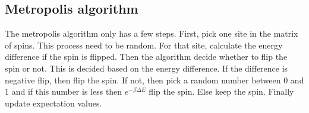 
\subsection{Metropolis algorithm}

The metropolis algorithm only has a few steps. First, pick one site in the matrix of spins. This process need to be random. For that site, calculate the energy difference if the spin is flipped. Then the algorithm decide whether to flip the spin or not. This is decided based on the energy difference. If the difference is negative flip, then flip the spin. If not, then pick a random number between 0 and 1 and if this number is less then $e^{-\beta \Delta E}$ flip the spin. Else keep the spin. Finally update expectation values.


\subsection{}



